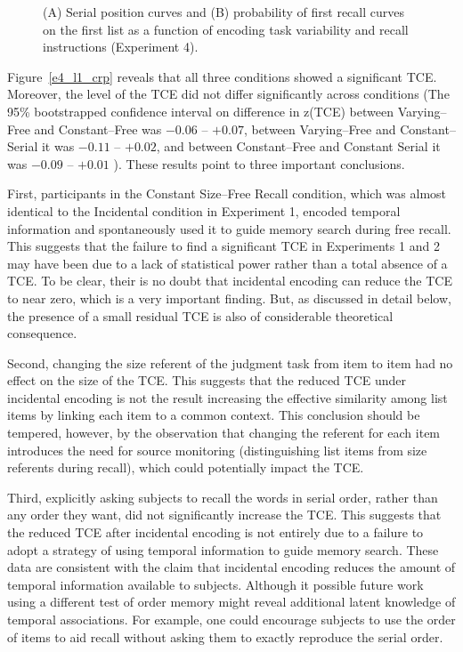 \documentclass[man,natbib,floatsintext]{apa6} %
\begin{document}
\begin{figure}
\caption{(A) Serial position curves and (B) probability of first recall curves on the first list as a function of encoding task variability and recall instructions (Experiment 4).\spcpaneltext}
\label{e4_l1_spc}
\end{figure}

Figure~\ref{e4_l1_crp} reveals that all three conditions showed a significant TCE. Moreover, the level of the TCE did not differ significantly across conditions (The 95\% bootstrapped confidence interval on difference in z(TCE) between Varying--Free and Constant--Free was $-0.06$ -- $+0.07$, between Varying--Free and Constant--Serial it was $-0.11$ -- $+0.02$, and between Constant--Free and Constant Serial it was $-0.09$ -- $+0.01$ ). These results point to three important conclusions.

First, participants in the Constant Size--Free Recall condition, which was almost identical to the Incidental condition in Experiment 1, encoded temporal information and spontaneously used it to guide memory search during free recall. This suggests that the failure to find a significant TCE in Experiments 1 and 2 may have been due to a lack of statistical power rather than a total absence of a TCE. To be clear, their is no doubt that incidental encoding can reduce the TCE to near zero, which is a very important finding. But, as discussed in detail below, the presence of a small residual TCE is also of considerable theoretical consequence.

Second, changing the size referent of the judgment task from item to item had no effect on the size of the TCE. This suggests that the reduced TCE under incidental encoding is not the result increasing the effective similarity among list items by linking each item to a common context. This conclusion should be tempered, however, by the observation that changing the referent for each item introduces the need for source monitoring (distinguishing list items from size referents during recall), which could potentially impact the TCE.  

Third, explicitly asking subjects to recall the words in serial order, rather than any order they want, did not significantly increase the TCE. This suggests that the reduced TCE after incidental encoding is not entirely due to a failure to adopt a strategy of using temporal information to guide memory search. These data are consistent with the claim that incidental encoding reduces the amount of temporal information available to subjects. Although it possible future work using a different test of order memory might reveal additional latent knowledge of temporal associations. For example, one could encourage subjects to use the order of items to aid recall without asking them to exactly reproduce the serial order. %
\end{document}

